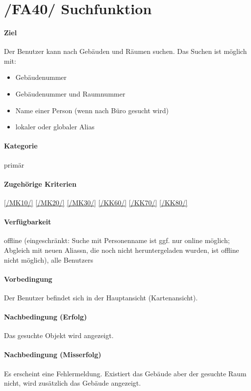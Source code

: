 \section[Suchfunktion]{/FA40/ Suchfunktion}
\label{/FA40/}
\paragraph{Ziel}
Der \Gls{Benutzer} kann nach Gebäuden und Räumen suchen. 
Das Suchen ist möglich mit:
\begin{itemize}
    \item Gebäudenummer
    \item Gebäudenummer und Raumnummer
    \item Name einer Person (wenn nach Büro gesucht wird)
    \item \gls{lokal}er oder \gls{global}er \Gls{Alias}
\end{itemize}

\paragraph{Kategorie}
primär
\paragraph{Zugehörige Kriterien}
\ref{/MK10/} \ref{/MK20/} \ref{/MK30/} \ref{/KK60/} \ref{/KK70/} \ref{/KK80/} 
\paragraph{Verfügbarkeit}
\gls{offline} (eingeschränkt: Suche mit Personenname ist ggf. nur online möglich; Abgleich mit neuen \Glspl{Alias}n, die noch nicht heruntergeladen wurden, ist \gls{offline} nicht möglich), alle \Glspl{Benutzer}
\paragraph{Vorbedingung}
Der \Gls{Benutzer} befindet sich in der Hauptansicht (\Gls{Kartenansicht}).
\paragraph{Nachbedingung (Erfolg)}
Das gesuchte Objekt wird angezeigt.
\paragraph{Nachbedingung (Misserfolg)}
Es erscheint eine Fehlermeldung. Existiert das Gebäude aber der gesuchte Raum nicht, wird zusätzlich das Gebäude angezeigt.
